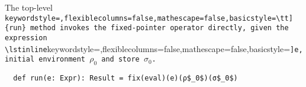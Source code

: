 The top-level \lstinline[keywordstyle=,flexiblecolumns=false,mathescape=false,basicstyle=\tt]{run} method invokes the fixed-pointer operator directly,
given the expression \lstinline[keywordstyle=,flexiblecolumns=false,mathescape=false,basicstyle=\tt]{e}, initial environment $\rho_0$ and store $\sigma_0$.
\begin{lstlisting}
  def run(e: Expr): Result = fix(eval)(e)(ρ$_0$)(σ$_0$)
\end{lstlisting}
